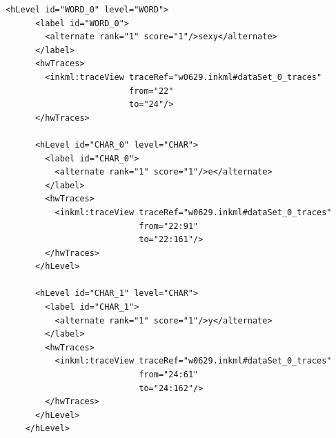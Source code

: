 \begin{xmlcode}
  \begin{lstlisting}[emph={hLevel,hwTraces},
                     emphstyle={\color{blue}\textbf},
                     emph={[2]id,level},
                     emphstyle={[2]\color{red}},
                     caption={Demonstration of the \emph{hLevel} tag in UPX},
                     label=lst:hLevelinupx]
    <hLevel id="WORD_0" level="WORD">
      <label id="WORD_0">
        <alternate rank="1" score="1"/>sexy</alternate>
      </label>
      <hwTraces> 
        <inkml:traceView traceRef="w0629.inkml#dataSet_0_traces" 
                         from="22" 
                         to="24"/>
      </hwTraces>

      <hLevel id="CHAR_0" level="CHAR">
        <label id="CHAR_0">
          <alternate rank="1" score="1"/>e</alternate>
        </label>
        <hwTraces> 
          <inkml:traceView traceRef="w0629.inkml#dataSet_0_traces" 
                           from="22:91" 
                           to="22:161"/>
        </hwTraces>
      </hLevel>

      <hLevel id="CHAR_1" level="CHAR">
        <label id="CHAR_1">
          <alternate rank="1" score="1"/>y</alternate>
        </label>
        <hwTraces> 
          <inkml:traceView traceRef="w0629.inkml#dataSet_0_traces" 
                           from="24:61" 
                           to="24:162"/>
        </hwTraces>
      </hLevel>
    </hLevel>
  \end{lstlisting}
\end{xmlcode}


